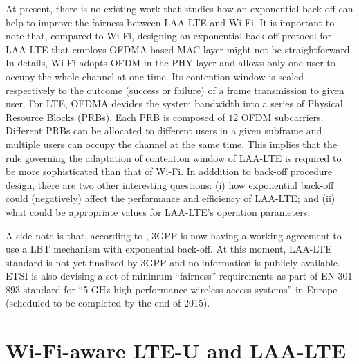 At present, there is no existing work that studies how an exponential back-off can help to improve the fairness between \mbox{LAA-LTE} and \mbox{Wi-Fi}. It is important to note that, compared to \mbox{Wi-Fi}, designing an exponential back-off protocol for \mbox{LAA-LTE} that employs OFDMA-based MAC layer might not be straightforward. In details, \mbox{Wi-Fi} adopts OFDM in the PHY layer and allows only one user to occupy the whole channel at one time. Its contention window is scaled respectively to the outcome (success or failure) of a frame transmission to given user. For LTE, OFDMA devides the system bandwidth into a series of Physical Resource Blocks (PRBs). Each PRB is composed of $12$ OFDM subcarriers. Different PRBs can be allocated to different users in a given subframe and multiple users can occupy the channel at the same time. This implies that the rule governing the adaptation of contention window of \mbox{LAA-LTE} is required to be more sophisticated than that of \mbox{Wi-Fi}. In adddition to back-off procedure design, there are two other interesting questions: (i) how exponential back-off could (negatively) affect the performance and efficiency of \mbox{LAA-LTE}; and (ii) what could be appropriate values for \mbox{LAA-LTE}'s operation parameters.

A side note is that, according to \cite{U-LTE-FCC-Cisco-2015}, 3GPP is now having a working agreement to use a LBT mechanism with exponential back-off. At this moment, \mbox{LAA-LTE} standard is not yet finalized by 3GPP and no information is publicly available. ETSI is also devising a set of minimum ``fairness'' requirements as part of EN 301 893 standard for ``5 GHz high performance wireless access systems'' in Europe (scheduled to be completed by the end of 2015).

\section{Wi-Fi-aware LTE-U and LAA-LTE}
\label{subsection:Wi-Fi-aware}

